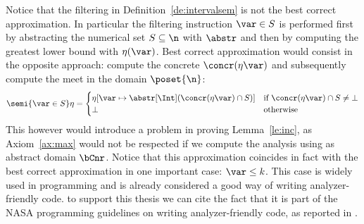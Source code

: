 Notice that the filtering in Definition~\ref{de:intervalsem} is not
the best correct approximation. In particular the filtering
instruction \(\var\in S\) is performed first by abstracting the
numerical set \(S \subseteq \n\) with \(\abstr\) and then by
computing the greatest lower bound with \(\eta(\var)\). Best correct
approximation would consist in the opposite approach: compute the
concrete \(\concr(\eta\var)\) and subsequently compute the meet in
the domain \(\poset{\n}\):
\begin{equation*}
  \semi{\var\in S}\eta = \begin{cases}
    \eta[\var \mapsto \abstr[\Int](\concr(\eta\var) \cap S)]
    & \text{if } \concr(\eta\var) \cap S \neq \bot \\
    \bot & \text{otherwise}
  \end{cases}
\end{equation*}
This however would introduce a problem in proving Lemma~\ref{le:inc},
as Axiom~\ref{ax:max} would not be respected if we compute the
analysis using as abstract domain \(\bCnr\).  Notice that this
approximation coincides in fact with the best correct approximation in
one important case: \(\var \leq k\). This case is widely used in
programming and is already considered a good way of writing
analyzer-friendly code. to support this thesis we can cite the fact
that it is part of the NASA programming guidelines on writing
analyzer-friendly code, as reported in \cite{nasa:ten}.